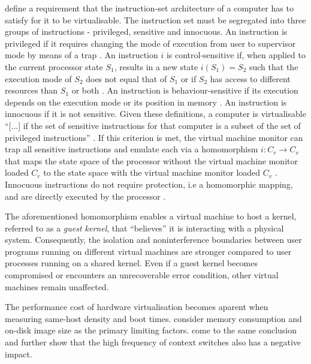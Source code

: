 \textcite{10.1145/361011.361073} define a requirement that the instruction-set architecture of a computer
has to satisfy for it to be virtualisable. The instruction set must be segregated into three groups of
instructions - privileged, sensitive and innocuous. An instruction is privileged if it requires changing
the mode of execution from user to supervisor mode by means of a trap \cite{10.1145/361011.361073}. 
An instruction $i$ is control-sensitive if, when applied to the current processor state $S_1$, results
in a new state $i(S_{1}) = S_{2}$ such that the execution mode of $S_{2}$ does not equal that of $S_{1}$
or if $S_{2}$ has access to different resources than $S_1$ or both \cite{10.1145/361011.361073}. 
An instruction is behaviour-sensitive if its execution depends on the execution mode or its position
in memory \cite{10.1145/361011.361073}. An instruction is innocuous if it is not sensitive. 
Given these definitions, a computer is virtualisable \enquote{[...] if the set of sensitive instructions
for that computer is a subset of the set of privileged instructions} \cite[6]{10.1145/361011.361073}.
If this criterion is met, the virtual machine monitor can trap all sensitive instructions and emulate 
each via a homomorphism $i: C_{r} \rightarrow C_{v}$ that maps the state space of the processor without
the virtual machine monitor loaded $C_{r}$ to the state space with the virtual machine monitor loaded 
$C_{v}$ \cite{10.1145/361011.361073}. Innocuous instructions do not require protection, i.e a homomorphic
mapping, and are directly executed by the processor \cite{10.1145/361011.361073}.

The aforementioned homomorphism enables a virtual machine to host a kernel, referred to as a \textit{guest kernel}, that 
\enquote{believes} it is interacting with a physical system.
Consequently, the isolation and noninterference boundaries between user programs 
running on different virtual machines are stronger compared to user processes running on a shared kernel. 
Even if a guest kernel becomes compromised or encounters an unrecoverable error condition, 
other virtual machines remain unaffected.

The performance cost of hardware virtualisation becomes aparent when measuring same-host density
and boot times. \textcite{10.1145/3132747.3132763} consider memory consumption and on-disk image size
as the primary limiting factors. \textcite{10.1145/2151024.2151030} come to the same conclusion and further 
show that the high frequency of context switches also has a negative impact.

